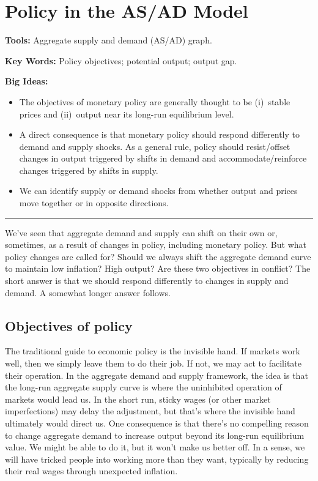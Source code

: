 \chapter{Policy in the AS/AD Model}\label{chp:pasad}
\hypertarget{asadpolicy}{}

\textbf{Tools:} Aggregate supply and demand (AS/AD) graph.

\textbf{Key Words:} Policy objectives; potential output; output gap.

\textbf{Big Ideas:}
\vspace{-0.1in}
\begin{itemize}
\item The objectives of monetary policy are generally thought to be
(i)~stable prices and (ii)~output near its long-run equilibrium level.
\item A direct consequence is that monetary policy should respond
differently to demand and supply shocks.
As a general rule, policy should resist/offset changes in output triggered by shifts in demand
and accommodate/reinforce changes triggered by shifts in supply.
\item We can identify supply or demand shocks from
 whether output and prices move together or in opposite directions.
\end{itemize}
\rule{\textwidth}{1pt}

We've seen that aggregate demand and supply can shift on their own or,
sometimes, as a result of changes in policy,
including monetary policy.
But what policy changes are called for?
Should we always shift the aggregate demand curve to maintain
low inflation?  High output?
Are these two objectives in conflict?
The short answer is that we should respond differently to changes in supply and demand.
A somewhat longer answer follows.


\section{Objectives of policy}

The traditional guide to economic policy is the invisible hand.
If markets work well, then we simply leave them to do their job.
If not, we may act to facilitate their operation.
In the aggregate demand and supply framework,
the idea is that the long-run aggregate supply curve
is where the uninhibited operation of markets would lead us.
In the short run, sticky wages (or other market imperfections)
may delay the adjustment, but that's
where the invisible hand ultimately would direct us.
One consequence is that there's no
compelling reason to change aggregate demand
to increase output beyond its long-run equilibrium value.
We might be able to do it, but it won't make us better off.
In a sense, we will have tricked people into working more than they
want,
typically by reducing their real wages through unexpected inflation.


